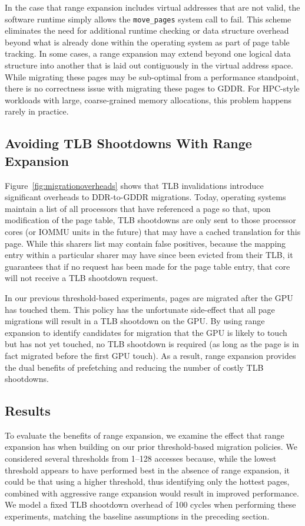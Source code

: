 In the case that range expansion
includes virtual addresses that are not valid, the software runtime simply allows the {\tt move\_pages}
system call to fail.  This scheme eliminates the need for additional runtime checking or data structure
overhead beyond what is already done within the operating system as part of page table tracking.
In some cases, a range expansion may extend beyond one logical data structure into another that is laid
out contiguously in the virtual address space.  While migrating these pages may be sub-optimal from a
performance standpoint, there is no correctness issue with migrating these pages to GDDR.  For
HPC-style workloads with large, coarse-grained memory allocations, this problem happens rarely in practice.

\subsection{Avoiding TLB Shootdowns With Range Expansion}
Figure~\ref{fig:migrationoverheads} shows that TLB invalidations introduce significant overheads to DDR-to-GDDR 
migrations.  Today, operating systems maintain a list of all processors that have referenced a page
so that, upon modification of the page table, TLB shootdowns are only sent to those processor cores 
(or IOMMU units in the future) that may have a cached translation for this page.  While this sharers list
may contain false positives, because the mapping entry within a particular sharer may have since been evicted from 
their TLB, it guarantees that if no request has been made for the page table entry, that core will not receive a TLB 
shootdown request.

In our previous threshold-based experiments, pages are migrated after the GPU has touched them.
This policy has the unfortunate side-effect that all page migrations will result in a TLB shootdown
on the GPU\@.  By using range expansion to identify candidates for migration that the GPU is likely to touch 
but has not yet touched, no TLB shootdown is required (as long as the page is in fact migrated before the 
first GPU touch).  As a result, range expansion provides the dual benefits of prefetching and reducing the 
number of costly TLB shootdowns.

\subsection{Results}
\label{rangeexpansionresults}
To evaluate the benefits of range expansion, we examine the effect that range expansion has when
building on our prior threshold-based migration policies.  We considered several thresholds from 1--128 accesses because, while 
the lowest threshold appears to have performed best in the absence of range expansion, it could be that using a higher
threshold, thus identifying only the hottest pages, combined with aggressive range expansion would result in improved performance. 
We model a fixed TLB shootdown overhead of 100 cycles  when performing these experiments, matching the baseline assumptions in the preceding section.

